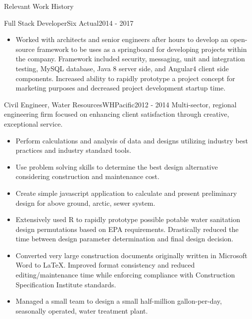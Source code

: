 \documentclass[]{mcdowellcv}
\begin{document}
\begin{cvsection}{Relevant Work History}
\begin{cvsubsection}{Full Stack Developer}{Six Actual}{2014 - 2017}
\begin{itemize}
				\\
				\item Worked with architects and senior engineers after hours to develop an open-source framework to be uses as a springboard for developing projects within the company.  Framework included security, messaging, unit and integration testing, MySQL database, Java 8 server side, and Angular4 client side components.  Increased ability to rapidly prototype a project concept for marketing purposes and decreased project development startup time.
			\end{itemize}
		\end{cvsubsection}
		
		\clearpage
		
		\begin{cvsubsection}{Civil Engineer, Water Resources}{WHPacific}{2012 - 2014}
			Multi-sector, regional engineering firm focused on enhancing client satisfaction through creative, exceptional service.
			\vspace{5pt}
			\begin{itemize}
				\item Perform calculations and analysis of data and designs utilizing industry best practices and industry standard tools.
				\\
				\item Use problem solving skills to determine the best design alternative considering construction and maintenance cost.
				\\
				\item Create simple javascript application to calculate and present preliminary design for above ground, arctic, sewer system.
				\\
				\item Extensively used \textsf{R} to rapidly prototype possible potable water sanitation design permutations based on EPA requirements.  Drastically reduced the time between design parameter determination and final design decision.
				\\
				\item Converted very large construction documents originally written in Microsoft Word to \LaTeX. Improved format consistency and reduced editing/maintenance time while enforcing compliance with Construction Specification Institute standards.
				\\
				\item Managed a small team to design a small half-million gallon-per-day, seasonally operated, water treatment plant.
			\end{itemize}
		\end{cvsubsection}
		

\end{cvsection}
\end{document}
